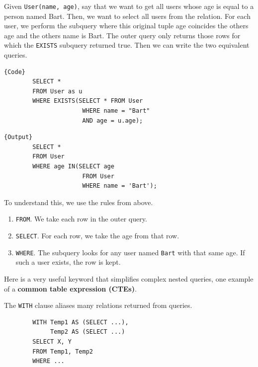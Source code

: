     \begin{example}[Age]
      Given \texttt{User(name, age)}, say that we want to get all users whose age is equal to a person named Bart. Then, we want to select all users from the relation. For each user, we perform the subquery where this original tuple age coincides the others age and the others name is Bart. The outer query only returns those rows for which the \texttt{EXISTS} subquery returned true. Then we can write the two equivalent queries. 

      \noindent\begin{minipage}{.5\textwidth}
      \begin{lstlisting}[]{Code}
        SELECT * 
        FROM User as u
        WHERE EXISTS(SELECT * FROM User
                      WHERE name = "Bart" 
                      AND age = u.age); 
      \end{lstlisting}
      \end{minipage}
      \hfill
      \begin{minipage}{.49\textwidth}
      \begin{lstlisting}[]{Output}
        SELECT * 
        FROM User 
        WHERE age IN(SELECT age 
                      FROM User 
                      WHERE name = 'Bart'); 
      \end{lstlisting}
      \end{minipage}

      To understand this, we use the rules from above. 
      \begin{enumerate}
        \item \texttt{FROM}. We take each row in the outer query. 
        \item \texttt{SELECT}. For each row, we take the age from that row.  
        \item \texttt{WHERE}. The subquery looks for any user named \texttt{Bart} with that same age. If such a user exists, the row is kept. 
      \end{enumerate}
    \end{example}

    Here is a very useful keyword that simplifies complex nested queries, one example of a \textbf{common table expression (CTEs)}. 
    
    \begin{definition}
      The \texttt{WITH} clause aliases many relations returned from queries. 
      \begin{lstlisting}
        WITH Temp1 AS (SELECT ...), 
             Temp2 AS (SELECT ...) 
        SELECT X, Y 
        FROM Temp1, Temp2 
        WHERE ...
      \end{lstlisting}
    \end{definition}

